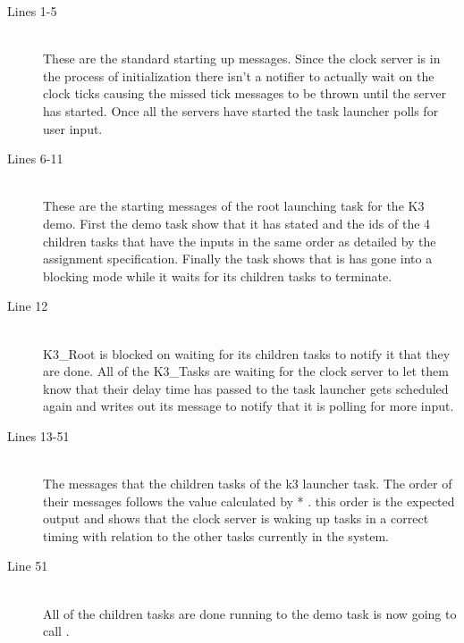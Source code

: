 \documentclass[pdftex,10pt,a4paper]{article}
\begin{document}
\newpage
\begin{description}
\item[Lines 1-5] \hfill \\
These are the standard starting up messages. Since the clock server is in the 
process of initialization there isn't a notifier to actually wait on the clock
ticks causing the missed tick messages to be thrown until the server has
started. Once all the servers have started the task launcher polls for user
input.

\item[Lines 6-11] \hfill \\
These are the starting messages of the root launching task for the K3 demo.
First the demo task show that it has stated and the ids of the 4 children
tasks that have the inputs in the same order as detailed by the assignment
specification. Finally the task shows that is has gone into a blocking mode
while it waits for its children tasks to terminate.

\item[Line 12] \hfill \\
K3\_Root is blocked on waiting for its children tasks to notify it that they
are done. All of the K3\_Tasks are waiting for the clock server to let them
know that their delay time has passed to the task launcher gets scheduled again
and writes out its message to notify that it is polling for more input.

\item[Lines 13-51] \hfill \\
The messages that the children tasks of the k3 launcher task. The order of
their messages follows the value calculated by  * . this
order is the expected output and shows that the clock server is waking up tasks
in a correct timing with relation to the other tasks currently in the system.

\item[Line 51] \hfill \\
All of the children tasks are done running to the demo task is now going to call
.

\end{description}
\end{document}
